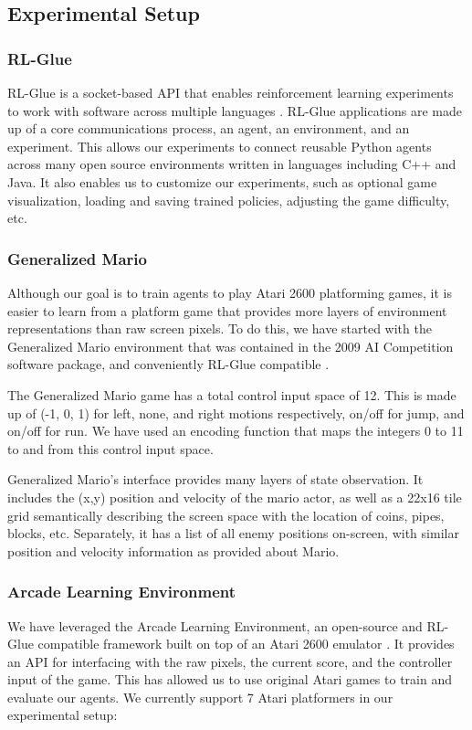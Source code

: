 \documentclass{article}
\begin{document}
\subsection{Experimental Setup}

\subsubsection{RL-Glue}
RL-Glue is a socket-based API that enables reinforcement learning experiments to work with software across multiple languages \cite{Tanner09}. RL-Glue applications are made up of a core communications process, an agent, an environment, and an experiment. This allows our experiments to connect reusable Python agents across many open source environments written in languages including C++ and Java. It also enables us to customize our experiments, such as optional game visualization, loading and saving trained policies, adjusting the game difficulty, etc.

\subsubsection{Generalized Mario}
Although our goal is to train agents to play Atari 2600 platforming games, it is easier to learn from a platform game that provides more layers of environment representations than raw screen pixels. To do this, we have started with the Generalized Mario environment that was contained in the 2009 AI Competition software package, and conveniently RL-Glue compatible \cite{Togelius10}.

The Generalized Mario game has a total control input space of 12. This is made up of (-1, 0, 1) for left, none, and right motions respectively, on/off for jump, and on/off for run. We have used an encoding function that maps the integers 0 to 11 to and from this control input space. 

Generalized Mario's interface provides many layers of state observation. It includes the (x,y) position and velocity of the mario actor, as well as a 22x16 tile grid semantically describing the screen space with the location of coins, pipes, blocks, etc. Separately, it has a list of all enemy positions on-screen, with similar position and velocity information as provided about Mario. 

\subsubsection{Arcade Learning Environment}
We have leveraged the Arcade Learning Environment, an open-source and RL-Glue compatible framework built on top of an Atari 2600 emulator \cite{bellemare13}.  It provides an API for interfacing with the raw pixels, the current score, and the controller input of the game. This has allowed us to use original Atari games to train and evaluate our agents. We currently support 7 Atari platformers in our experimental setup:
\end{document}
